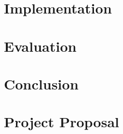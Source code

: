 \documentclass[12pt,a4paper,twoside,openany]{report}
\begin{document}
    \chapter{Implementation}\label{ch:implementation}
    


    \chapter{Evaluation}\label{ch:evaluation}
    


    \chapter{Conclusion}\label{ch:conclusion}
    

    


    \printbibliography[heading=bibintoc]

    \appendix


    \chapter{Project Proposal}\label{ch:proposal}
    
\end{document}
